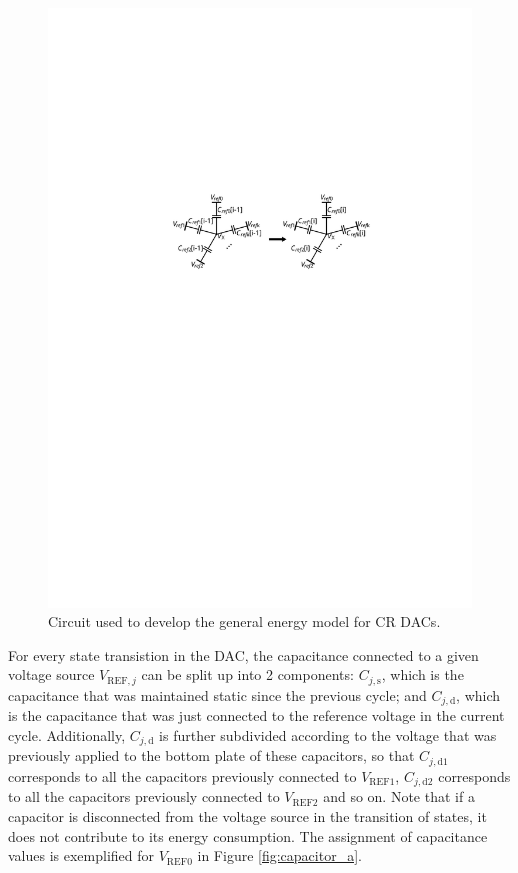 \documentclass[]{article}
\newcommand{\figref}[1]{Figure \ref{#1}}
\begin{document}
\begin{figure}
	\centering
	\includegraphics[scale=1.0]{figures/capacitor_switch_general_energy}
	\caption{Circuit used to develop the general energy model for CR DACs.}
	\label{fig:capacitor_switch_general_energy}
\end{figure}

For every state transistion in the DAC, the capacitance connected to a given voltage source $V_{\mathrm{REF},j}$ can be split up into 2 components: $C_{j,\mathrm{s}}$, which is the capacitance that was maintained static since the previous cycle; and $C_{j,\mathrm{d}}$, which is the capacitance that was just connected to the reference voltage in the current cycle. Additionally, $C_{j,\mathrm{d}}$ is further subdivided according to the voltage that was previously applied to the bottom plate of these capacitors, so that $C_{j,\mathrm{d}1}$ corresponds to all the capacitors previously connected to $V_\mathrm{REF1}$, $C_{j,\mathrm{d}2}$ corresponds to all the capacitors previously connected to $V_\mathrm{REF2}$ and so on. Note that if a capacitor is disconnected from the voltage source in the transition of states, it does not contribute to its energy consumption. The assignment of capacitance values is exemplified for $V_\mathrm{REF0}$ in \figref{fig:capacitor_a}.
\end{document}
